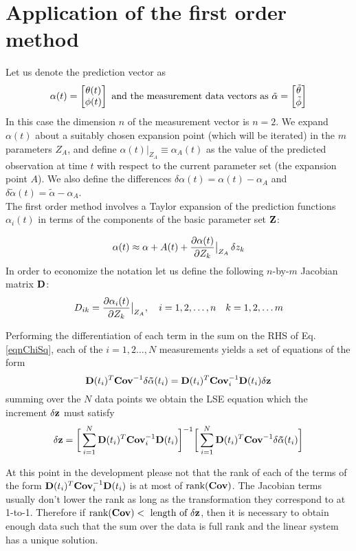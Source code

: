 \section{Application of the first order method}
Let us denote the prediction vector as 
$${\alpha(t)} = 
\begin{bmatrix}
\theta(t) \\
\phi(t)\\
\end{bmatrix}\hbox{ and the measurement data vectors as  } 
\tilde\alpha = 
\begin{bmatrix}
\tilde\theta\\
\tilde\phi\\
\end{bmatrix}$$In this case the dimension $n$ of the measurement vector is $n=2$. We expand $\alpha(t)$ about a suitably chosen expansion point (which will be iterated) in the $m$ parameters
$Z_A$, and define $\alpha(t)|_{Z_A} \equiv \alpha_A(t)$ as the value of the predicted observation at time $t$ with respect to the current parameter set (the expansion point $A$). We also define the 
differences $\delta\alpha(t) = \alpha(t) - \alpha_A$ and $\delta\tilde\alpha(t) = \tilde\alpha - \alpha_A$.\\

The first order method involves a Taylor expansion of the prediction functions $\alpha_i(t)$ in terms of the components of the basic parameter set $\bf Z$:

$$\alpha(t) \approx \alpha+A(t) + {\partial \alpha(t)\over \partial Z_k}\big|_{Z_A}\, \delta z_k$$In order to economize the notation let us define the following $n$-by-$m$ Jacobian matrix $\bf D$:
$$D_{ik}={\partial \alpha_i(t)\over \partial Z_k}\big|_{Z_A}, \quad i=1,2,\hdots,n\quad k = 1,2,\hdots m$$

Performing the differentiation of each term in the sum on the RHS of Eq.\eqref{eqnChiSq}, each of the $i=1,2\hdots,N$ measurements yields a set of equations of the form
$${\bf D}(t_i)^T\hbox{\bf Cov}^{-1} {\bf \delta \tilde\alpha}(t_i) = {\bf D}(t_i)^T\hbox{\bf Cov}_i^{-1} {\bf D}(t_i)\delta {\bf z}$$summing over the $N$ data points we obtain the LSE equation which the increment
$\bf \delta z$ must satisfy
$${\bf \delta z} = \bigg[\sum_{i=1}^N {\bf D}(t_i)^T\hbox{\bf Cov}_i^{-1} {\bf D}(t_i) \bigg]^{-1} \bigg[ \sum_{i=1}^N {\bf D}(t_i)^T\hbox{\bf Cov}^{-1} {\bf \delta \tilde\alpha}(t_i) \bigg]$$

At this point in the development please not that the rank of each of the terms of the form ${\bf D}(t_i)^T\hbox{\bf Cov}_i^{-1} {\bf D}(t_i)$ is at most of $\hbox{rank({\bf Cov})}$. The Jacobian terms usually
don't lower the rank as long as the transformation they correspond to at 1-to-1. Therefore if $\hbox{rank({\bf Cov})} < \hbox{ length of } {\bf \delta z}$, then it is necessary to obtain enough data such that
the sum over the data is full rank and the linear system has a unique solution. \\

